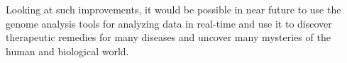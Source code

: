 \documentclass[12pt,twoside]{article}
\begin{document}
Looking at such improvements, it would be possible in near future to use the genome analysis tools for analyzing data in real-time and use it to
discover therapeutic remedies for many diseases and uncover many mysteries of the human and biological world. 


\printbibliography
\end{document}
